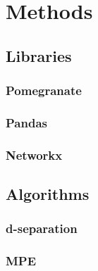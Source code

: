 
\section{Methods}
\subsection{Libraries}
\subsubsection{Pomegranate}
\subsubsection{Pandas}
\subsubsection{Networkx}
\subsection{Algorithms}
\subsubsection{d-separation}
\subsubsection{MPE}